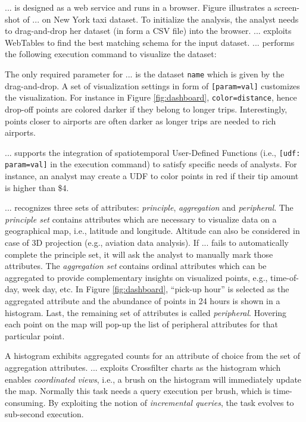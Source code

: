\documentclass[runningheads,a4paper]{llncs}
\begin{document}
... is designed as a web service and runs in a browser. Figure illustrates a screen-shot of ... on New York taxi dataset. To initialize the analysis, the analyst needs to drag-and-drop her dataset (in form a CSV file) into the browser. ... exploits {\sc WebTables} \cite{cafarella2008webtables} to find the best matching schema for the input dataset. ... performs the following execution command to visualize the dataset:


The only required parameter for ... is the dataset {\tt \small name} which is given by the drag-and-drop. A set of visualization settings in form of {\tt \small [param=val]} customizes the visualization. 
For instance in Figure \ref{fig:dashboard}, {\tt \small color=distance}, hence drop-off points are colored darker if they belong to longer trips. Interestingly, points closer to airports are often darker as longer trips are needed to rich airports.

... supports the integration of spatiotemporal User-Defined Functions (i.e., {\tt \small [udf: param=val]} in the execution command) to satisfy specific needs of analysts. For instance, an analyst may create a UDF to color points in red if their tip amount is higher than \$4.

... recognizes three sets of attributes: {\em principle}, {\em aggregation} and {\em peripheral}. The {\em principle set} contains attributes which are necessary to visualize data on a geographical map, i.e., latitude and longitude. Altitude can also be considered in case of 3D projection (e.g., aviation data analysis). If ... fails to automatically complete the principle set, it will ask the analyst to manually mark those attributes. The {\em aggregation set} contains ordinal attributes which can be aggregated to provide complementary insights on visualized points, e.g., time-of-day, week day, etc. In Figure \ref{fig:dashboard}, ``pick-up hour'' is selected as the aggregated attribute and the abundance of points in 24 hours is shown in a histogram. Last, the remaining set of attributes is called {\em peripheral}. Hovering each point on the map will pop-up the list of peripheral attributes for that particular point.

A histogram exhibits aggregated counts for an attribute of choice from the set of aggregation attributes. ... exploits Crossfilter charts \cite{cf} as the histogram which enables {\em coordinated views}, i.e., a brush on the histogram will immediately update the map. Normally this task needs a query execution per brush, which is time-consuming. By exploiting the notion of {\em incremental queries}, the task evolves to sub-second execution.
\end{document}
